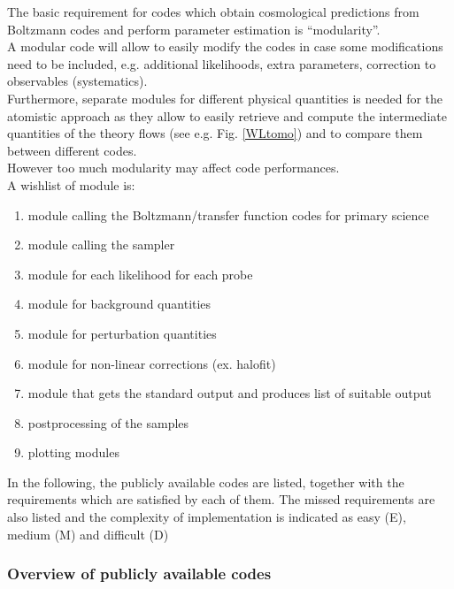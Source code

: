 The basic requirement for codes which obtain cosmological predictions from Boltzmann codes and perform parameter estimation is ``modularity''.\\
A modular code will allow to easily modify the codes in case some modifications need to be included, e.g. additional likelihoods, extra parameters, correction to observables (systematics).\\
Furthermore, separate modules for different physical quantities is needed for the atomistic approach as they allow to easily retrieve and compute the intermediate quantities of the theory
flows (see e.g. Fig. \ref{WLtomo}) and to compare them between different codes.\\
However too much modularity may affect code performances.\\

A wishlist of module is:
\begin{enumerate}
 \item module calling the Boltzmann/transfer function codes for primary science
 \item module calling the sampler
 \item module for each likelihood for each probe
 \item module for background quantities
 \item module for perturbation quantities
 \item module for non-linear corrections (ex. halofit)
 \item module that gets the standard output and produces list of suitable output
 \item postprocessing of the samples
 \item plotting modules 
\end{enumerate}

In the following, the publicly available codes are listed, together with the requirements which are satisfied by each of them. The missed requirements are also listed and the complexity 
of implementation is indicated as easy (E), medium (M) and difficult (D)

\subsubsection{Overview of publicly available codes}

